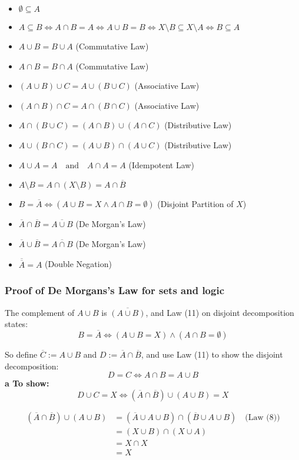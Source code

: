 \begin{itemize}[label=$-$]
	\item $\emptyset \subseteq A$
	\item $A \subseteq B \iff A \cap B = A \iff A \cup B = B \iff X \setminus B \subseteq X \setminus A \iff B \subseteq A$
	\item $A \cup B = B \cup A$ \hfill (Commutative Law)
	\item $A \cap B = B \cap A$ \hfill (Commutative Law)
	\item $(A \cup B) \cup C = A \cup (B \cup C)$ \hfill (Associative Law)
	\item $(A \cap B) \cap C = A \cap (B \cap C)$ \hfill (Associative Law)
	\item $A \cap (B \cup C) = (A \cap B) \cup (A \cap C)$ \hfill (Distributive Law)
	\item $A \cup (B \cap C) = (A \cup B) \cap (A \cup C)$ \hfill (Distributive Law)
	\item $A \cup A = A \quad \text{and} \quad A \cap A = A$ \hfill (Idempotent Law)
	\item $A \setminus B = A \cap (X \setminus B) = A \cap \overline{B}$
	\item $B = \overline{A} \iff (A \cup B = X \land A \cap B = \emptyset)$ \hfill (Disjoint Partition of $X$)
	\item $\overline{A} \cap \overline{B} = \overline{A \cup B}$ \hfill (De Morgan's Law)
	\item $\overline{A} \cup \overline{B} = \overline{A \cap B}$ \hfill (De Morgan's Law)
	\item $\overline{\overline{A}} = A$ \hfill (Double Negation)
\end{itemize}

\subsubsection{Proof of De Morgans's Law for sets and logic}
The complement of \( A \cup B \) is \( \overline{(A \cup B)} \), and Law (11) on disjoint decomposition states:
\[
	B = \overline{A} \iff (A \cup B = X) \land (A \cap B = \emptyset)
\]

So define \( \overline{C} := A \cup B \) and \( D := \overline{A} \cap \overline{B} \),
and use Law (11) to show the disjoint decomposition:
\[
	D = C \iff A \cap B = A \cup B
\]
\smallskip
\textbf{a To show:}
\[
	D \cup C = X \iff (\overline{A} \cap \overline{B}) \cup (A \cup B) = X
\]

\begin{align*}
	(\overline{A} \cap \overline{B}) \cup (A \cup B)
	 & = (\overline{A} \cup A \cup B) \cap (\overline{B} \cup A \cup B) \quad \text{(Law (8))} \\
	 & = (X \cup B) \cap (X \cup A)                                                            \\
	 & = X \cap X                                                                              \\
	 & = X
\end{align*}

